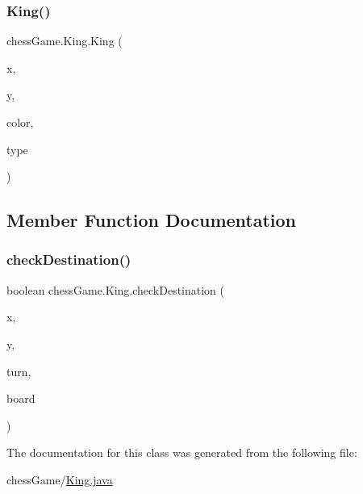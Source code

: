\subsubsection{\texorpdfstring{King()}{King()}}
{\footnotesize\ttfamily chess\+Game.\+King.\+King (\begin{DoxyParamCaption}\item[{int}]{x,  }\item[{int}]{y,  }\item[{\hyperlink{classchess_game_1_1_piece_ad5117cbbbaebf3a27c4f3c2bcbd6678b}{color}}]{color,  }\item[{\hyperlink{classchess_game_1_1_piece_a1370c7f61581a1b72fa8ac2fd1af70a2}{type}}]{type }\end{DoxyParamCaption})}



\subsection{Member Function Documentation}
\hypertarget{classchess_game_1_1_king_a391861e09b20c62177db5f399ad94320}{}\label{classchess_game_1_1_king_a391861e09b20c62177db5f399ad94320} 
\subsubsection{\texorpdfstring{check\+Destination()}{checkDestination()}}
{\footnotesize\ttfamily boolean chess\+Game.\+King.\+check\+Destination (\begin{DoxyParamCaption}\item[{int}]{x,  }\item[{int}]{y,  }\item[{int}]{turn,  }\item[{\hyperlink{classchess_game_1_1_chess_board}{Chess\+Board}}]{board }\end{DoxyParamCaption})}



The documentation for this class was generated from the following file\+:\begin{DoxyCompactItemize}
\item 
chess\+Game/\hyperlink{_king_8java}{King.\+java}\end{DoxyCompactItemize}
